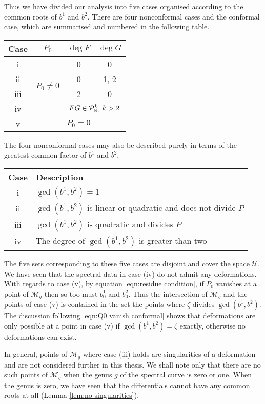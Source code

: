 Thus we have divided our analysis into five cases organised according to the common roots of $b^1$ and $b^2$. There are four nonconformal cases and the conformal case, which are summarised and numbered in the following table.
\begin{center}
\begin{tabular}{|c|c|c|c|}
\hline
Case & $P_0$ & $\deg F$ & $\deg G$ \\ \hline\hline
i & \multirow{4}{*}{$P_0 \neq 0$} & 0 & 0 \\ \cline{1-1}\cline{3-4}
ii && 0 & 1, 2 \\ \cline{1-1}\cline{3-4}
iii && 2 & 0 \\ \cline{1-1}\cline{3-4}
iv && \multicolumn{2}{|c|}{$FG \in \mathcal{P}^k_\R,\, k>2$} \\ \hline
v & \multicolumn{3}{|c|}{$P_0 = 0$} \\ \hline
\end{tabular}
\end{center}
The four nonconformal cases may also be described purely in terms of the greatest common factor of $b^1$ and $b^2$.
\begin{center}
\begin{tabular}{|c|l|}
\hline
Case & Description\\ \hline\hline
i & $\gcd(b^1,b^2) = 1$\\ \hline
ii & $\gcd(b^1,b^2)$ is linear or quadratic and does not divide $P$ \\ \hline
iii & $\gcd(b^1,b^2)$ is quadratic and divides $P$ \\ \hline
iv & The degree of $\gcd(b^1,b^2)$ is greater than two \\ \hline
\end{tabular}
\end{center}

The five sets corresponding to these five cases are disjoint and cover the space $\mathcal{U}$. We have seen that the spectral data in case (iv) do not admit any deformations.
With regards to case (v), by equation \eqref{eqn:residue condition}, if $P_0$ vanishes at a point of $\mathcal{M}_g$ then so too must $b^1_0$ and $b^2_0$. Thus the intersection of $\mathcal{M}_g$ and the points of case (v) is contained in the set the points where $ζ$ divides $\gcd(b^1,b^2)$. The discussion following \eqref{eqn:Q0 vanish conformal} shows that deformations are only possible at a point in case (v) if $\gcd(b^1,b^2) = ζ$ exactly, otherwise no deformations can exist.

In general, points of $\mathcal{M}_g$ where case (iii) holds are singularities of a deformation \cite{Schmidt2016} and are not considered further in this thesis. We shall note only that there are no such points of $\mathcal{M}_g$ when the genus $g$ of the spectral curve is zero or one.
When the genus is zero, we have seen that the differentials cannot have any common roots at all (Lemma \ref{lem:no singularities}).

